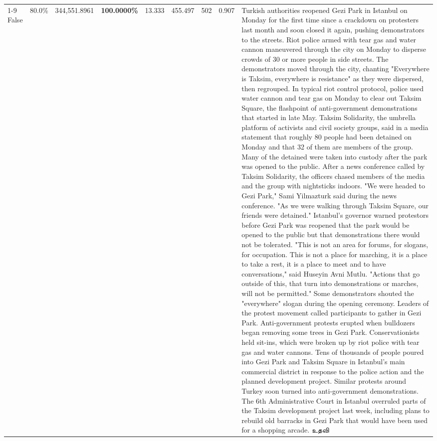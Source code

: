 \begin{table}[H]
\begin{tabular}{lllrlllll}
\cline{1-9}
False & 80.0\% & 344,551.8961 & \bfseries \color{red} 100.0000\% & 13.333 & 455.497 & 502 & 0.907 & Turkish authorities reopened Gezi Park in Istanbul on Monday for the first time since a crackdown on protesters last month and soon closed it again, pushing demonstrators to the streets. Riot police armed with tear gas and water cannon maneuvered through the city on Monday to disperse crowds of 30 or more people in side streets. The demonstrators moved through the city, chanting "Everywhere is Taksim, everywhere is resistance" as they were dispersed, then regrouped. In typical riot control protocol, police used water cannon and tear gas on Monday to clear out Taksim Square, the flashpoint of anti-government demonstrations that started in late May. Taksim Solidarity, the umbrella platform of activists and civil society groups, said in a media statement that roughly 80 people had been detained on Monday and that 32 of them are members of the group. Many of the detained were taken into custody after the park was opened to the public. After a news conference called by Taksim Solidarity, the officers chased members of the media and the group with nightsticks indoors. "We were headed to Gezi Park," Sami Yilmazturk said during the news conference. "As we were walking through Taksim Square, our friends were detained." Istanbul's governor warned protestors before Gezi Park was reopened that the park would be opened to the public but that demonstrations there would not be tolerated. "This is not an area for forums, for slogans, for occupation. This is not a place for marching, it is a place to take a rest, it is a place to meet and to have conversations," said Huseyin Avni Mutlu. "Actions that go outside of this, that turn into demonstrations or marches, will not be permitted." Some demonstrators shouted the "everywhere" slogan during the opening ceremony. Leaders of the protest movement called participants to gather in Gezi Park. Anti-government protests erupted when bulldozers began removing some trees in Gezi Park. Conservationists held sit-ins, which were broken up by riot police with tear gas and water cannons. Tens of thousands of people poured into Gezi Park and Taksim Square in Istanbul's main commercial district in response to the police action and the planned development project. Similar protests around Turkey soon turned into anti-government demonstrations. The 6th Administrative Court in Istanbul overruled parts of the Taksim development project last week, including plans to rebuild old barracks in Gezi Park that would have been used for a shopping arcade. உதவி \\

\end{tabular}
\end{table}
